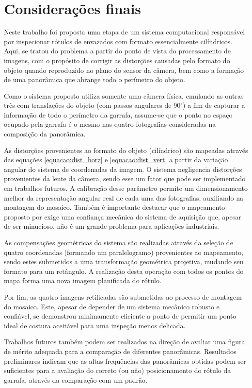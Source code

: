 \chapter{Considerações finais}

Neste trabalho foi proposta uma etapa de um sistema computacional responsável por inspecionar rótulos de envazados com formato essencialmente cilíndricos. Aqui, se tratou do problema a partir do ponto de vista do processamento de imagens, com o propósito de corrigir as distorções causadas pelo formato do objeto quando reproduzido no plano do sensor da câmera, bem como a formação de uma panorâmica que abrange todo o perímetro do objeto.

Como o sistema proposto utiliza somente uma câmera física, emulando as outras três com translações do objeto (com passos angulares de 90$^\circ$) a fim de capturar a informação de todo o perímetro da garrafa, assume-se que o ponto no espaço ocupado pela garrafa é o mesmo nas quatro fotografias consideradas na composição da panorâmica. 

As distorções provenientes ao formato do objeto (cilíndrico) são mapeadas através das equações \eqref{equacao:dist_horz} e \eqref{equacao:dist_vert} a partir da variação angular do sistema de coordenadas da imagem. O sistema negligencia distorções provenientes da lente da câmera, sendo esse um fator que pode ser implementado em trabalhos futuros. A calibração desse parâmetro permite um dimensionamento melhor da representação angular real de cada uma das fotografias, auxiliando na montagem do mosaico. Também é importante destacar que o mapeamento proposto por \cite{Lin:2013} exige uma confiança mecânica do sistema de aquisição que, apesar de ser minucioso, não é um grande problema para aplicações industriais.

As compensações geométricas do sistema são realizadas através da seleção de quatro coordenadas (formando um paralelogramo) provenientes ao mapeamento, sendo estes submetidos a uma transformação geométrica projetiva, mudando seu formato para um retângulo. A realização desta operação com todos os pontos do mapa forma uma nova imagem planificada do rótulo.

Por fim, as quatro imagens retificadas são submetidas ao processo de montagem do mosaico. Este, apesar de depender de um sistema mecânico robusto e confiável, se demonstrou minimamente eficiente a ponto de permitir um ponto ideal de costura aceitável para uma inspeção menos delicada.

Trabalhos futuros  também podem ser realizados na direção de avaliar uma figura de mérito adequada para a  comparação de diferentes panorâmicas. Resultados preliminares indicam que as altas frequências das panorâmicas obtidas podem ser suficientes para a avaliação do correto (ou não) posicionamento do rótulo da garrafa, através da comparação com um padrão.

